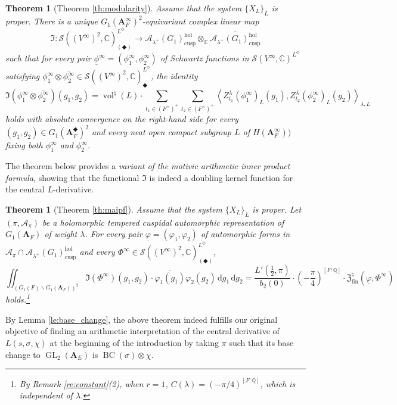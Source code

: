 \documentclass[12pt]{amsart}
\numberwithin{equation}{section}
\theoremstyle{plain}
\newtheorem{theorem}[proposition]{Theorem}
\theoremstyle{definition}
\theoremstyle{remark}
\renewcommand{\b}[1]{\mathbf{#1}}
\renewcommand{\c}[1]{\mathcal{#1}}
\renewcommand{\d}[1]{\mathbb{#1}}
\newcommand{\f}[1]{\mathfrak{#1}}
\renewcommand{\r}[1]{\mathrm{#1}}
\newcommand{\s}[1]{\mathscr{#1}}
\renewcommand{\(}{\left(}
\renewcommand{\)}{\right)}
\newcommand{\ol}[1]{\overline{#1}{}}
\newcommand{\ul}{\underline}
\newcommand{\bA}{\b A}
\newcommand{\cA}{\c A}
\newcommand{\dC}{\d C}
\newcommand{\dQ}{\d Q}
\newcommand{\fI}{\f I}
\newcommand{\fZ}{\f Z}
\newcommand{\rd}{\,\r d}
\newcommand{\sS}{\s S}
\newcommand{\llangle}{\left\langle}
\newcommand{\rrangle}{\right\rangle}
\newcommand{\cusp}{\r{cusp}}
\newcommand{\fin}{\r{fin}}
\newcommand{\hol}{\r{hol}}
\DeclareMathOperator{\BC}{BC}
\DeclareMathOperator{\GL}{GL}
\DeclareMathOperator{\vol}{vol}
\begin{document}
\begin{theorem}[Theorem \ref{th:modularity}]
Assume that the system $\{X_L\}_L$ is proper. There is a unique $G_1(\bA_F^\infty)^2$-equivariant complex linear map
\[
\fI\colon\sS((V^\infty)^2,\dC)^{L^\Diamond}_{(\Diamondblack)}\to
\cA_{\lambda^+}(G_1)_\cusp^\hol\otimes_\dC\ol{\cA_{\lambda^+}(G_1)_\cusp^\hol}
\]
such that for every pair $\ul\phi^\infty=(\phi^\infty_1,\phi^\infty_2)$ of Schwartz functions in $\sS(V^\infty,\dC)^{L^\Diamond}$ satisfying $\phi^\infty_1\otimes\ol{\phi^\infty_2}\in\sS((V^\infty)^2,\dC)^{L^\Diamond}_\Diamondblack$, the identity
\[
\fI(\phi^\infty_1\otimes\ol{\phi^\infty_2})(g_1,g_2)=\vol^\natural(L)\cdot\sum_{t_1\in(F^\times)^+}\sum_{t_2\in(F^\times)^+}
\llangle Z^\lambda_{t_1}(\phi^\infty_1)_L(g_1),Z^\lambda_{t_2}(\phi^\infty_2)_L(g_2)\rrangle_{\lambda,L}
\]
holds with absolute convergence on the right-hand side for every $(g_1,g_2)\in G_1(\bA_F^\Diamondblack)^2$ and every neat open compact subgroup $L$ of $H(\bA_F^\infty))$ fixing both $\phi^\infty_1$ and $\phi^\infty_2$.
\end{theorem}

The theorem below provides a \emph{variant of the motivic arithmetic inner product formula}, showing that the functional $\fI$ is indeed a doubling kernel function for the central $L$-derivative.


\begin{theorem}[Theorem \ref{th:maipf}]\label{th:maipf_intro}
Assume that the system $\{X_L\}_L$ is proper. Let $(\pi,\cA_\pi)$ be a holomorphic tempered cuspidal automorphic representation of $G_1(\bA_F)$ of weight $\lambda$. For every pair $\ul\varphi=(\varphi_1,\varphi_2)$ of automorphic forms in $\cA_\pi\cap\cA_{\lambda^+}(G_1)_\cusp^\hol$ and every $\Phi^\infty\in\sS((V^\infty)^2,\dC)^{L^\Diamond}_{(\Diamondblack)}$,
\[
\iint_{(G_1(F)\backslash G_1(\bA_F))^2}
\fI(\Phi^\infty)(g_1,g_2)\cdot\ol{\varphi_1(g_1)}\varphi_2(g_2)\rd g_1\rd g_2
=\frac{L'(\tfrac{1}{2},\pi)}{b_2(0)}\cdot \(-\frac{\pi}{4}\)^{[F:\dQ]}\cdot
\fZ^\natural_\fin(\ul\varphi,\Phi^\infty)
\]
holds.\footnote{By Remark \ref{re:constant}(2), when $r=1$, $C(\lambda)=\(-\pi/4\)^{[F:\dQ]}$, which is independent of $\lambda$.}
\end{theorem}

By Lemma \ref{le:base_change}, the above theorem indeed fulfills our original objective of finding an arithmetic interpretation of the central derivative of $L(s,\sigma,\chi)$ at the beginning of the introduction by taking $\pi$ such that its base change to $\GL_2(\bA_E)$ is $\BC(\sigma)\otimes\chi$.
\end{document}
